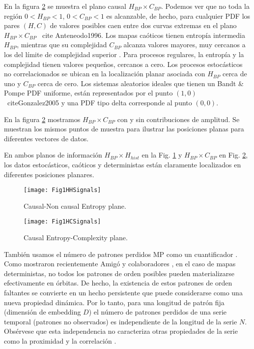 En la figura \ref{fig:HC} se muestra el plano causal $H_{BP} \times C_{BP}$.
Podemos ver que no toda la región $0 < H_{BP} < 1$, $0 < C_{BP} < 1$ es alcanzable, de hecho, para cualquier PDF los pares $(H, C)$ de valores posibles caen entre dos curvas extremas en el plano $H_{BP} \times C_{BP}$ \ cite {Anteneodo1996}.
Los mapas caóticos tienen entropía intermedia $H_{BP}$, mientras que su complejidad $C_{BP}$ alcanza valores mayores, muy cercanos a los del límite de complejidad superior \cite{Rosso2007, Olivares2012}.
Para procesos regulares, la entropía y la complejidad tienen valores pequeños, cercanos a cero.
Los procesos estocásticos no correlacionados se ubican en la localización planar asociada con $H_{BP}$ cerca de uno y $C_{BP}$ cerca de cero.
Los sistemas aleatorios ideales que tienen un Bandt \& Pompe PDF uniforme, están representados por el punto $(1,0)$ \ cite{Gonzalez2005} y una PDF tipo delta corresponde al punto $(0,0)$.

En la figura \ref{fig:HC} mostramos $H_{BP} \times C_{BP}$ con y sin contribuciones de amplitud.
Se muestran los mismos puntos de muestra para ilustrar las posiciones planas para diferentes vectores de datos.

En ambos planos de información $H_ {BP} \times H_ {hist}$ en la Fig. \ref{fig:HH} y $H_{BP} \times C_{BP}$ en Fig. \ref{fig:HC}, los datos estocásticos, caóticos y deterministas están claramente localizados en diferentes posiciones planares.

\begin{figure}[htpb]
	\centering	
	\texttt{[image: Fig1HHSignals]}
	\caption{Causal-Non causal Entropy plane.}
	\label{fig:HH}
\end{figure}

\begin{figure}[htpb]
	\centering		
	\texttt{[image: Fig1HCSignals]}
	\caption{Causal Entropy-Complexity plane.}
	\label{fig:HC}
\end{figure}

También usamos el número de patrones perdidos MP como un cuantificador \cite {Rosso2012}.
Como mostraron recientemente Amigó y colaboradores \cite{Amigo2006,Amigo2007,Amigo2008,Amigo2010}, en el caso de mapas deterministas, no todos los patrones de orden posibles pueden materializarse efectivamente en órbitas.
De hecho, la existencia de estos patrones de orden faltantes se convierte en un hecho persistente que puede considerarse como una nueva propiedad dinámica.
Por lo tanto, para una longitud de patrón fija (dimensión de embedding $D$) el número de patrones perdidos de una serie temporal (patrones no observados) es independiente de la longitud de la serie $N$.
Obsérvese que esta independencia no caracteriza otras propiedades de la serie como la proximidad y la correlación \cite{Amigo2007,Amigo2010}.

